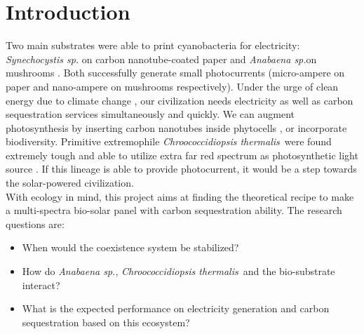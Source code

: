 \documentclass[a4paper, 11pt]{article}
\newcommand{\As}{\textit{Anabaena sp.}}
\newcommand{\Ct}{\textit{Chroococcidiopsis thermalis}}
\begin{document}
\section{Introduction}
Two main substrates were able to print cyanobacteria for electricity:  \textit{Synechocystis sp.} on carbon nanotube-coated paper \autocite{sawa2017electricity} and \As on mushrooms \autocite{joshi2018bacterial}.  Both successfully generate small photocurrents (micro-ampere on paper \autocite{sawa2017electricity} and nano-ampere on mushrooms \autocite{joshi2018bacterial} respectively).  Under the urge of clean energy due to climate change \autocite{schuur2015climate}, our civilization needs electricity as well as carbon sequestration services simultaneously and quickly.  We can augment photosynthesis by inserting carbon nanotubes inside phytocells \autocite{giraldo2014plant}, or incorporate biodiversity.  Primitive extremophile \Ct\ were found extremely tough \autocite{baque2013boss} and able to utilize extra far red spectrum as photosynthetic light source \autocite{nurnberg2018photochemistry}.  If this lineage is able to provide photocurrent, it would be a step towards the solar-powered civilization.\\

With ecology in mind, this project aims at finding the theoretical recipe to make a multi-spectra bio-solar panel with carbon sequestration ability.  The research questions are:
\begin{itemize}
	\item When would the coexistence system be stabilized?
	\item How do \As, \Ct\ and the bio-substrate interact?
	\item What is the expected performance on electricity generation and carbon sequestration based on this ecosystem?
\end{itemize}
\end{document}
